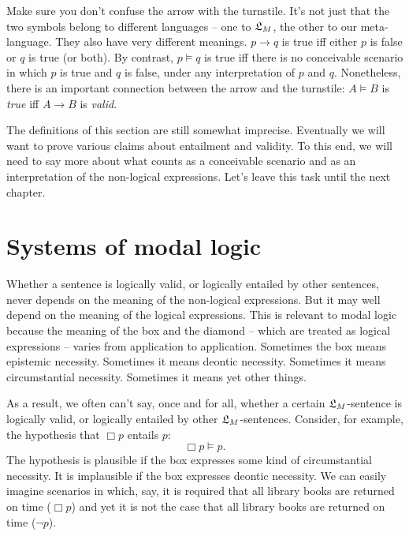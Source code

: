 Make sure you don't confuse the arrow with the turnstile. It's not just that the
two symbols belong to different languages -- one to $\mathfrak{L}_{M}$, the other to our
meta-language. They also have very different meanings. $p \to q$ is true iff
either $p$ is false or $q$ is true (or both). By contrast, $p \models q$ is true
iff there is no conceivable scenario in which $p$ is true and $q$ is false,
under any interpretation of $p$ and $q$. Nonetheless, there is an important
connection between the arrow and the turnstile: $A \models B$ is \emph{true} iff
$A \to B$ is \emph{valid}.

The definitions of this section are still somewhat imprecise. Eventually we will
want to prove various claims about entailment and validity. To this end, we will
need to say more about what counts as a conceivable scenario and as an
interpretation of the non-logical expressions. Let's leave this task until the
next chapter.


\section{Systems of modal logic}%
\label{sec:systems}

Whether a sentence is logically valid, or logically entailed by other sentences,
never depends on the meaning of the non-logical expressions. But it may well
depend on the meaning of the logical expressions. This is relevant to modal
logic because the meaning of the box and the diamond -- which are treated as
logical expressions -- varies from application to application. Sometimes the box
means epistemic necessity. Sometimes it means deontic necessity. Sometimes it
means circumstantial necessity. Sometimes it means yet other things.

As a result, we often can't say, once and for all, whether a certain
$\mathfrak{L}_{M}$-sentence is logically valid, or logically entailed by other
$\mathfrak{L}_{M}$-sentences. Consider, for example, the hypothesis that $\Box p$ entails
$p$:
\[
  \Box p \models p.
\]
The hypothesis is plausible if the box expresses some kind of circumstantial
necessity. It is implausible if the box expresses deontic necessity. We can
easily imagine scenarios in which, say, it is required that all library books
are returned on time ($\Box p$) and yet it is not the case that all library
books are returned on time ($\neg p$).

